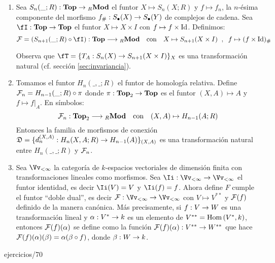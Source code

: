 \documentclass[../../topologia_algebraica]{subfiles}
\begin{document}
\begin{ejemplo}
  \begin{enumerate}
  \item Sea $S_{n}(\_;R):\mathbf{Top}\rightarrow{}_R\mathbf{Mod}$ el funtor
    $X\mapsto S_{n}(X;R)$ y $f\mapsto f_{n}$, la $n$-\'esima componente del morfismo
    $f_{\#}:S_{\bullet}(X)\rightarrow S_{\bullet}(Y)$ de complejos de cadena. Sea $\fI:\cat{Top}\ra\cat{Top}$
    el funtor $X\mapsto X\times I$ con $f\mapsto f\times\text{Id}$. Definimos:
    \[
      \Ff=(S_{n+1}(\_;R)\circ\fI):\cat{Top}\lra {}_R\cat{Mod} \quad\text{con}\quad
      X\mapsto S_{n+1}(X\times I)\;\;,\;\; f\mapsto (f\times\Id)_{\#}
    \]
    
    Observa que $\fT=\{T_A:S_n(X)\ra S_{n+1}(X\times I)\}_{X}$ es una transformaci\'on natural
    (cf. secci\'on \ref{sec:invariancia}).
  \item Tomamos el funtor $H_n(\_,\_;R)$ el funtor de homolog\'ia relativa. Define
    $\mathcal{F}_n=H_{n-1}(\_;R)\circ\pi$ donde $\pi:\mathbf{Top}_2\rightarrow\mathbf{Top}$ es el funtor
    $(X,A)\mapsto A$ y $f\mapsto f|_{A}$. En s\'imbolos:
    \[
      \mathcal{F}_n:\mathbf{Top}_2\longrightarrow {}_R\mathbf{Mod} \quad\text{con}\quad (X,A)\mapsto H_{n-1}(A;R)
    \]
    Entonces la familia de morfismos de conexi\'on $\mathfrak{D}=\{d_n^{(X,A)}:H_n(X,A;R)\rightarrow H_{n-1}(A)\}_{(X,A)}$
    es una transformaci\'on natural entre $H_n(\_,\_;R)$ y $\mathcal{F}_n$.
  \item Sea $\Vv_{<\infty}$ la categor\'ia de $k$-espacios vectoriales de dimensi\'on finita con
  transformaciones lineales como morfismos. Sea $\Ii:\Vv_{<\infty}\ra\Vv_{<\infty}$ el funtor
  identidad, es decir $\Ii(V)=V$ y $\Ii(f)=f$. Ahora define $F$ cumple el funtor ``doble dual'',
  es decir $\Ff:\Vv_{<\infty}\ra\Vv_{<\infty}$ con $V\mapsto V^{**}$ y $\mathcal{F}(f)$ definido de la
  manera can\'onica. M\'as precisamente, si $f:V\rightarrow W$ es una transformaci\'on lineal y
  $\alpha:V^*\rightarrow k$ es un elemento de $V^{**}=\text{Hom}\left( V^*,k \right)$, entonces $\mathcal{F}(f)(\alpha)$ se define
  como la funci\'on $\mathcal{F}(f)(\alpha):V^{**}\rightarrow W^{**}$ que hace
  $\mathcal{F}(f)(\alpha)(\beta)=\alpha(\beta\circ f)$, donde $\beta:W\rightarrow k$.
    
  \end{enumerate}
\end{ejemplo}
 {ejercicios/70} %
\end{document}
